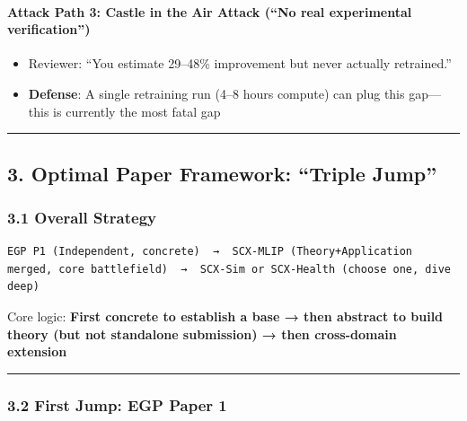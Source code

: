 \documentclass[
  12pt,
]{article}
\providecommand{\tightlist}{%
  \setlength{\itemsep}{0pt}\setlength{\parskip}{0pt}}
\begin{document}
\paragraph{Attack Path 3: Castle in the Air Attack (``No real experimental verification'')}\label{attack-path-3-castle-in-the-air-attack}

\begin{itemize}
\tightlist
\item
  Reviewer: ``You estimate 29--48\% improvement but never actually retrained.''
\item
  \textbf{Defense}: A single retraining run (4--8 hours compute) can plug this gap---this is currently the most fatal gap
\end{itemize}

\begin{center}\rule{0.5\linewidth}{0.5pt}\end{center}

\subsection{3. Optimal Paper Framework: ``Triple Jump''}\label{optimal-paper-framework-triple-jump}

\subsubsection{3.1 Overall Strategy}\label{overall-strategy}

\begin{verbatim}
EGP P1 (Independent, concrete)  →  SCX-MLIP (Theory+Application merged, core battlefield)  →  SCX-Sim or SCX-Health (choose one, dive deep)
\end{verbatim}

Core logic: \textbf{First concrete to establish a base → then abstract to build theory (but not standalone submission) → then cross-domain extension}

\begin{center}\rule{0.5\linewidth}{0.5pt}\end{center}

\subsubsection{3.2 First Jump: EGP Paper 1}\label{first-jump-egp-paper-1}
\end{document}
